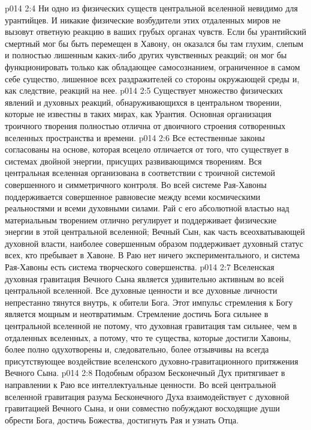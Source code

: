 \vs p014 2:4 Ни одно из физических существ центральной вселенной невидимо для урантийцев. И никакие физические возбудители этих отдаленных миров не вызовут ответную реакцию в ваших грубых органах чувств. Если бы урантийский смертный мог бы быть перемещен в Хавону, он оказался бы там глухим, слепым и полностью лишенным каких\hyp{}либо других чувственных реакций; он мог бы функционировать только как обладающее самосознанием, ограниченное в самом себе существо, лишенное всех раздражителей со стороны окружающей среды и, как следствие, реакций на нее.
\vs p014 2:5 \pc Существует множество физических явлений и духовных реакций, обнаруживающихся в центральном творении, которые не известны в таких мирах, как Урантия. Основная организация троичного творения полностью отлична от двоичного строения сотворенных вселенных пространства и времени.
\vs p014 2:6 Все естественные законы согласованы на основе, которая всецело отличается от того, что существует в системах двойной энергии, присущих развивающимся творениям. Вся центральная вселенная организована в соответствии с троичной системой совершенного и симметричного контроля. Во всей системе Рая\hyp{}Хавоны поддерживается совершенное равновесие между всеми космическими реальностями и всеми духовными силами. Рай с его абсолютной властью над материальным творением отлично регулирует и поддерживает физические энергии в этой центральной вселенной; Вечный Сын, как часть всеохватывающей духовной власти, наиболее совершенным образом поддерживает духовный статус всех, кто пребывает в Хавоне. В Раю нет ничего экспериментального, и система Рая\hyp{}Хавоны есть система творческого совершенства.
\vs p014 2:7 Вселенская духовная гравитация Вечного Сына является удивительно активным во всей центральной вселенной. Все духовные ценности и все духовные личности непрестанно тянутся внутрь, к обители Бога. Этот импульс стремления к Богу является мощным и неотвратимым. Стремление достичь Бога сильнее в центральной вселенной не потому, что духовная гравитация там сильнее, чем в отдаленных вселенных, а потому, что те существа, которые достигли Хавоны, более полно одухотворены и, следовательно, более отзывчивы на всегда присутствующее воздействие вселенского духовно\hyp{}гравитационного притяжения Вечного Сына.
\vs p014 2:8 Подобным образом Бесконечный Дух притягивает в направлении к Раю все интеллектуальные ценности. Во всей центральной вселенной гравитация разума Бесконечного Духа взаимодействует с духовной гравитацией Вечного Сына, и они совместно побуждают восходящие души обрести Бога, достичь Божества, достигнуть Рая и узнать Отца.
